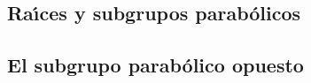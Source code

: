 \subsection{Ra\'{\i}ces y subgrupos parab\'{o}licos}\label{subsec:raices}


\subsection{El subgrupo parab\'{o}lico opuesto}\label{subsec:opuesto}


